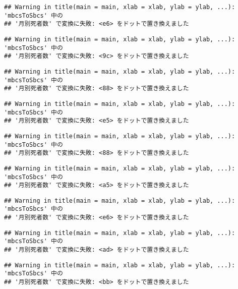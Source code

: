 \documentclass[]{article}
\begin{document}
\begin{verbatim}
## Warning in title(main = main, xlab = xlab, ylab = ylab, ...): 'mbcsToSbcs' 中の
## '月別死者数' で変換に失敗: <e6> をドットで置き換えました
\end{verbatim}

\begin{verbatim}
## Warning in title(main = main, xlab = xlab, ylab = ylab, ...): 'mbcsToSbcs' 中の
## '月別死者数' で変換に失敗: <9c> をドットで置き換えました
\end{verbatim}

\begin{verbatim}
## Warning in title(main = main, xlab = xlab, ylab = ylab, ...): 'mbcsToSbcs' 中の
## '月別死者数' で変換に失敗: <88> をドットで置き換えました
\end{verbatim}

\begin{verbatim}
## Warning in title(main = main, xlab = xlab, ylab = ylab, ...): 'mbcsToSbcs' 中の
## '月別死者数' で変換に失敗: <e5> をドットで置き換えました
\end{verbatim}

\begin{verbatim}
## Warning in title(main = main, xlab = xlab, ylab = ylab, ...): 'mbcsToSbcs' 中の
## '月別死者数' で変換に失敗: <88> をドットで置き換えました
\end{verbatim}

\begin{verbatim}
## Warning in title(main = main, xlab = xlab, ylab = ylab, ...): 'mbcsToSbcs' 中の
## '月別死者数' で変換に失敗: <a5> をドットで置き換えました
\end{verbatim}

\begin{verbatim}
## Warning in title(main = main, xlab = xlab, ylab = ylab, ...): 'mbcsToSbcs' 中の
## '月別死者数' で変換に失敗: <e6> をドットで置き換えました
\end{verbatim}

\begin{verbatim}
## Warning in title(main = main, xlab = xlab, ylab = ylab, ...): 'mbcsToSbcs' 中の
## '月別死者数' で変換に失敗: <ad> をドットで置き換えました
\end{verbatim}

\begin{verbatim}
## Warning in title(main = main, xlab = xlab, ylab = ylab, ...): 'mbcsToSbcs' 中の
## '月別死者数' で変換に失敗: <bb> をドットで置き換えました
\end{verbatim}
\end{document}
